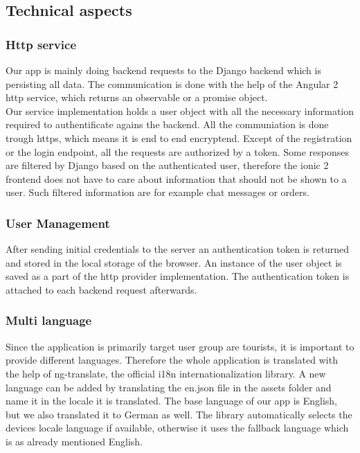 \documentclass[11pt]{article} %
\begin{document}
\subsection{Technical aspects}
\subsubsection{Http service}
Our app is mainly doing backend requests to the Django backend which is persisting all data. The communication is done with the help of the Angular 2 http service, which returns an observable or a promise object.\\
Our service implementation holds a user object with all the necessary information required to authentificate agains the backend. All the communiation is done trough https, which means it is end to end encryptend. Except of the registration or the login endpoint, all the requests are authorized by a token\cite{djoser}. Some responses are  filtered by Django based on the authenticated user, therefore the ionic 2 frontend does not have to care about information that should not be shown to a user. Such filtered information are for example chat messages or orders.

\subsubsection{User Management}
After sending initial credentials to the server an authentication token is returned and stored in the local storage of the browser. An instance of the user object is saved as a part of the http provider implementation. The authentication token is attached to each backend request afterwards.

\subsubsection{Multi language}
Since the application is primarily target user group are tourists, it is important to provide different languages. Therefore the whole application is translated with the help of ng-translate\cite{ng-translate}, the official i18n internationalization library. A new language can be added by translating the en.json file in the assets folder and name it in the locale it is translated. The base language of our app is English, but we also translated it to German as well. The library automatically selects the devices locale language if available, otherwise it uses the fallback language which is as already mentioned English.
\end{document}
